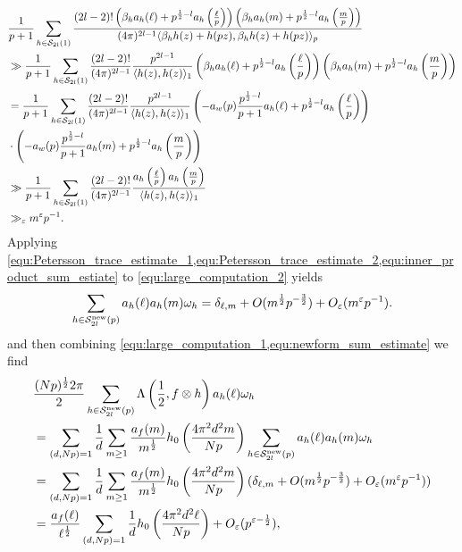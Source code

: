 \documentclass[12pt,reqno,oneside]{amsart}
\begin{document}
    \begin{equation}\label{equ:inner_product_sum_estiate}
        \begin{aligned}
            &\frac{1}{p+1}\sum_{h \in \mathcal{S}_{2l}(1)}\frac{(2l-2)!\left(\beta_{h}a_{h}(\ell)+p^{\frac{1}{2}-l}a_{h}\left(\frac{\ell}{p}\right)\right)\left(\beta_{h}a_{h}(m)+p^{\frac{1}{2}-l}a_{h}\left(\frac{m}{p}\right)\right)}{(4\pi)^{2l-1}\langle\beta_{h}h(z)+h(pz),\beta_{h}h(z)+h(pz)\rangle_{p}} \\
            &\gg \frac{1}{p+1}\sum_{h \in \mathcal{S}_{2l}(1)}\frac{(2l-2)!}{(4\pi)^{2l-1}}\frac{p^{2l-1}}{\langle h(z),h(z)\rangle_{1}}\left(\beta_{h}a_{h}(\ell)+p^{\frac{1}{2}-l}a_{h}\left(\frac{\ell}{p}\right)\right)\left(\beta_{h}a_{h}(m)+p^{\frac{1}{2}-l}a_{h}\left(\frac{m}{p}\right)\right) \\
            &= \frac{1}{p+1}\sum_{h \in \mathcal{S}_{2l}(1)}\frac{(2l-2)!}{(4\pi)^{2l-1}}\frac{p^{2l-1}}{\langle h(z),h(z)\rangle_{1}}\left(-a_{w}(p)\frac{p^{\frac{1}{2}-l}}{p+1}a_{h}(\ell)+p^{\frac{1}{2}-l}a_{h}\left(\frac{\ell}{p}\right)\right) \\
            &\cdot \left(-a_{w}(p)\frac{p^{\frac{1}{2}-l}}{p+1}a_{h}(m)+p^{\frac{1}{2}-l}a_{h}\left(\frac{m}{p}\right)\right) \\
            &\gg \frac{1}{p+1}\sum_{h \in \mathcal{S}_{2l}(1)}\frac{(2l-2)!}{(4\pi)^{2l-1}}\frac{a_{h}\left(\frac{\ell}{p}\right)a_{h}\left(\frac{m}{p}\right)}{\langle h(z),h(z)\rangle_{1}} \\
            &\gg_{\varepsilon} m^{\varepsilon}p^{-1}.
        \end{aligned}
    \end{equation}
    Applying \cref{equ:Petersson_trace_estimate_1,equ:Petersson_trace_estimate_2,equ:inner_product_sum_estiate} to \cref{equ:large_computation_2} yields
    \begin{equation}\label{equ:newform_sum_estimate}
        \sum_{h \in \mathcal{S}_{2l}^{\text{new}}(p)}a_{h}(\ell)a_{h}(m)\omega_{h} = \delta_{\ell,m}+O(m^{\frac{1}{2}}p^{-\frac{3}{2}})+O_{\varepsilon}(m^{\varepsilon}p^{-1}).
    \end{equation}
    and then combining \cref{equ:large_computation_1,equ:newform_sum_estimate} we find
    \begin{equation}\label{equ:large_computation_3}
        \begin{aligned}
            & \frac{(Np)^{\frac{1}{2}}2\pi}{2}\sum_{h \in \mathcal{S}_{2l}^{\text{new}}(p)}\Lambda\left(\frac{1}{2},f \otimes h\right)a_{h}(\ell)\omega_{h} \\
            &= \sum_{(d,Np) = 1}\frac{1}{d}\sum_{m \ge 1}\frac{a_{f}(m)}{m^{\frac{1}{2}}}h_{0}\left(\frac{4\pi^{2}d^{2}m}{Np}\right)\sum_{h \in \mathcal{S}_{2l}^{\text{new}}(p)}a_{h}(\ell)a_{h}(m)\omega_{h} \\
            &= \sum_{(d,Np) = 1}\frac{1}{d}\sum_{m \ge 1}\frac{a_{f}(m)}{m^{\frac{1}{2}}}h_{0}\left(\frac{4\pi^{2}d^{2}m}{Np}\right)(\delta_{\ell,m}+O(m^{\frac{1}{2}}p^{-\frac{3}{2}})+O_{\varepsilon}(m^{\varepsilon}p^{-1})) \\
            &= \frac{a_{f}(\ell)}{\ell^{\frac{1}{2}}}\sum_{(d,Np) = 1}\frac{1}{d}h_{0}\left(\frac{4\pi^{2}d^{2}\ell}{Np}\right)+O_{\varepsilon}(p^{\varepsilon-\frac{1}{2}}),
        \end{aligned}
    \end{equation}
\end{document}
